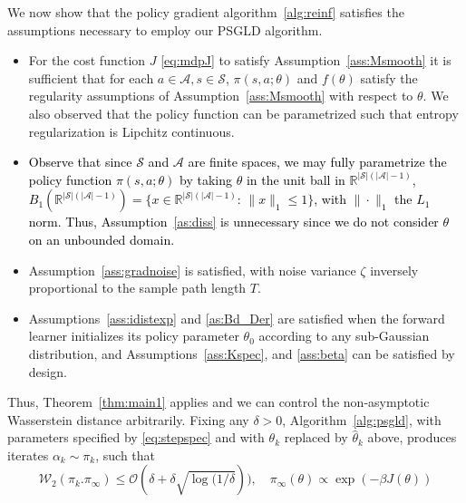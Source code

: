 \documentclass[journal,onecolumn]{IEEEtran}
\newcommand{\thk}{\theta_k}
\newcommand{\rew}{J}
\newcommand{\reals}{\mathbb{R}}
\newcommand{\wass}{\mathcal{W}_2}
\newcommand{\gibbs}{\ids_{\infty}}
\newcommand{\dtlaw}{\ids_{k}} %
\newcommand{\ids}{\pi}
\newcommand{\idw}{\gamma}
\newcommand{\ksp}{k,\idw}
\newcommand{\gradnvar}{\zeta}
\newcommand{\CS}{\mathcal{S}}
\newcommand{\CA}{\mathcal{A}}
\begin{document}
{\color{black} We now show that the policy gradient algorithm~\eqref{alg:reinf} satisfies the assumptions necessary to employ our PSGLD algorithm. 
\begin{itemize}
    \item[-] For the cost function $\rew$ \eqref{eq:mdpJ} to satisfy Assumption~\ref{ass:Msmooth} it is sufficient that for each $a\in\CA,s\in\CS$, $\pi(s,a;\theta)$ and $f(\theta)$ satisfy the regularity assumptions of Assumption~\ref{ass:Msmooth} with respect to $\theta$. We also observed that the policy function can be parametrized such that entropy regularization is Lipchitz continuous.
    \item[-] \textcolor{black}{Observe that since $\CS$ and $\CA$ are finite spaces, we may fully parametrize the policy function $\pi(s,a;\theta)$ by taking $\theta$ in the unit ball in $\reals^{|\CS|(|\CA|-1)}$, $B_1(\reals^{|\CS|(|\CA|-1)}) = \{x\in \reals^{|\CS|(|\CA|-1)} : \, \|x\|_1\leq 1\}$, with $\|\cdot\|_1$ the $L_1$ norm. Thus, Assumption~\ref{as:diss} is unnecessary since we do not consider $\theta$ on an unbounded domain.}
    \item[-] Assumption~\ref{ass:gradnoise} is satisfied, with noise variance $\gradnvar$ inversely proportional to the sample path length $T$. \item[-] Assumptions~\ref{ass:idistexp} and \ref{as:Bd_Der} are satisfied when the forward learner initializes its policy parameter $\theta_0$ according to any sub-Gaussian distribution, and Assumptions~\ref{ass:Kspec}, and \ref{ass:beta} can be satisfied by design.
\end{itemize}

Thus, Theorem~\ref{thm:main1} applies and we can control the non-asymptotic Wasserstein distance arbitrarily. Fixing any $\delta>0$, Algorithm~\ref{alg:psgld}, with parameters specified by \eqref{eq:stepspec} and with $\thk$ replaced by $\hat{\theta}_k$ above, produces iterates $\alpha_k \sim \dtlaw$, such that \[\wass(\dtlaw.\gibbs) \leq \mathcal{O}(\delta + \delta\sqrt{\log(1/\delta})), \quad \gibbs(\theta) \propto \exp(-\beta J(\theta))\] 

}
\end{document}
